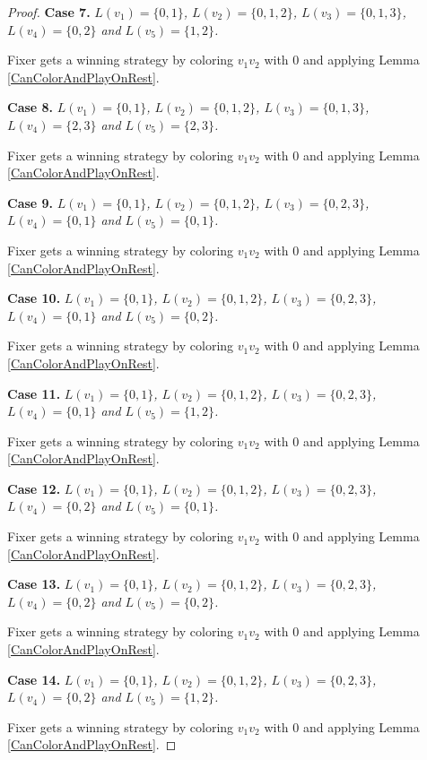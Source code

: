 \documentclass[12pt]{amsart}
\theoremstyle{plain}
\theoremstyle{definition}
\theoremstyle{remark}
\begin{document}
\begin{proof}
\noindent\textbf{Case 7.  }\textit{$L(v_1) = \{0, 1\}$, $L(v_2) = \{0, 1, 2\}$, $L(v_3) = \{0, 1, 3\}$, $L(v_4) = \{0, 2\}$ and $L(v_5) = \{1, 2\}$.}

Fixer gets a winning strategy by coloring $v_1v_2$ with $0$ and applying Lemma \ref{CanColorAndPlayOnRest}.

\noindent\textbf{Case 8.  }\textit{$L(v_1) = \{0, 1\}$, $L(v_2) = \{0, 1, 2\}$, $L(v_3) = \{0, 1, 3\}$, $L(v_4) = \{2, 3\}$ and $L(v_5) = \{2, 3\}$.}

Fixer gets a winning strategy by coloring $v_1v_2$ with $0$ and applying Lemma \ref{CanColorAndPlayOnRest}.

\noindent\textbf{Case 9.  }\textit{$L(v_1) = \{0, 1\}$, $L(v_2) = \{0, 1, 2\}$, $L(v_3) = \{0, 2, 3\}$, $L(v_4) = \{0, 1\}$ and $L(v_5) = \{0, 1\}$.}

Fixer gets a winning strategy by coloring $v_1v_2$ with $0$ and applying Lemma \ref{CanColorAndPlayOnRest}.

\noindent\textbf{Case 10.  }\textit{$L(v_1) = \{0, 1\}$, $L(v_2) = \{0, 1, 2\}$, $L(v_3) = \{0, 2, 3\}$, $L(v_4) = \{0, 1\}$ and $L(v_5) = \{0, 2\}$.}

Fixer gets a winning strategy by coloring $v_1v_2$ with $0$ and applying Lemma \ref{CanColorAndPlayOnRest}.

\noindent\textbf{Case 11.  }\textit{$L(v_1) = \{0, 1\}$, $L(v_2) = \{0, 1, 2\}$, $L(v_3) = \{0, 2, 3\}$, $L(v_4) = \{0, 1\}$ and $L(v_5) = \{1, 2\}$.}

Fixer gets a winning strategy by coloring $v_1v_2$ with $0$ and applying Lemma \ref{CanColorAndPlayOnRest}.

\noindent\textbf{Case 12.  }\textit{$L(v_1) = \{0, 1\}$, $L(v_2) = \{0, 1, 2\}$, $L(v_3) = \{0, 2, 3\}$, $L(v_4) = \{0, 2\}$ and $L(v_5) = \{0, 1\}$.}

Fixer gets a winning strategy by coloring $v_1v_2$ with $0$ and applying Lemma \ref{CanColorAndPlayOnRest}.

\noindent\textbf{Case 13.  }\textit{$L(v_1) = \{0, 1\}$, $L(v_2) = \{0, 1, 2\}$, $L(v_3) = \{0, 2, 3\}$, $L(v_4) = \{0, 2\}$ and $L(v_5) = \{0, 2\}$.}

Fixer gets a winning strategy by coloring $v_1v_2$ with $0$ and applying Lemma \ref{CanColorAndPlayOnRest}.

\noindent\textbf{Case 14.  }\textit{$L(v_1) = \{0, 1\}$, $L(v_2) = \{0, 1, 2\}$, $L(v_3) = \{0, 2, 3\}$, $L(v_4) = \{0, 2\}$ and $L(v_5) = \{1, 2\}$.}

Fixer gets a winning strategy by coloring $v_1v_2$ with $0$ and applying Lemma \ref{CanColorAndPlayOnRest}.


\end{proof}
\end{document}
